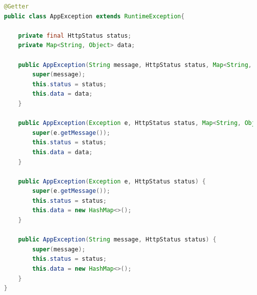 \begin{lstlisting}[language=Java, caption={Exceção \textit{AppException}}, label={AppException}]
@Getter
public class AppException extends RuntimeException{

    private final HttpStatus status;
    private Map<String, Object> data;

    public AppException(String message, HttpStatus status, Map<String, Object> data) {
        super(message);
        this.status = status;
        this.data = data;
    }

    public AppException(Exception e, HttpStatus status, Map<String, Object> data) {
        super(e.getMessage());
        this.status = status;
        this.data = data;
    }

    public AppException(Exception e, HttpStatus status) {
        super(e.getMessage());
        this.status = status;
        this.data = new HashMap<>();
    }

    public AppException(String message, HttpStatus status) {
        super(message);
        this.status = status;
        this.data = new HashMap<>();
    }
}
\end{lstlisting}